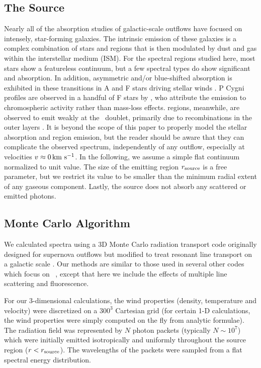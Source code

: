 \documentclass[12pt,preprint]{aastex}
\begin{document}
\subsection{The Source}

Nearly all of the absorption studies of galactic-scale outflows 
have focused on intensely, star-forming galaxies.  The
intrinsic emission of these galaxies is a complex combination of
stars and  regions that is then modulated by dust and gas
within the interstellar medium (ISM).  For the spectral regions studied
here, most stars show a featureless continuum, but a few spectral
types do show significant  and  absorption.
In addition, asymmetric and/or blue-shifted absorption is exhibited in these
transitions in A and F stars driving stellar winds \citep{sll+94}.
 P Cygni profiles are observed in a handful of F stars by \cite{sll+94}, who
attribute the emission to chromospheric activity rather than mass-loss effects.
 regions, meanwhile, are observed to emit weakly
at the \mgiid\ doublet, primarily due to recombinations in the outer
layers \citep{kbc+93}.
It is beyond the scope of this paper to
properly model the 
stellar absorption and  region emission, but the reader
should be aware that they can complicate the observed spectrum,
independently of any outflow, especially at velocities $v \approx 0 \, {\rm km~s^{-1}}$.
In the following, we assume a simple flat continuum 
normalized to unit value.  The size of the emitting
region $r_{\rm source}$ is a free parameter, but we restrict its value
to be smaller than the minimum radial extent of any gaseous
component.   Lastly, the source does not absorb any scattered or
emitted photons.


\subsection{Monte Carlo Algorithm}
\label{sec:monte}


We calculated spectra using a 3D Monte Carlo radiation transport code
originally designed for supernova outflows  \citep{Kasen_2006} but
modified to treat resonant line transport  on a galactic scale
\citep{Kasen_lyman}.  Our methods are similar to those used in several
other codes which focus on \lya\
\citep[e.g.,][]{Zheng_2002,Dijkstra_2006,Verhame_2006,Laursen_2009},
except that here we include the effects of multiple line scattering
and fluorescence. 

For our 3-dimensional calculations, the  wind properties (density, temperature and velocity) were discretized on a $300^3$ Cartesian grid (for certain 1-D calculations, the wind properties were simply computed on the fly from analytic formulae).   
The radiation field was represented by $N$ photon packets (typically $N \sim 10^7$) which were initially emitted isotropically and uniformly throughout the source region ($r < r_{\rm source}$).  The wavelengths of the packets were sampled from a flat spectral energy distribution. 
\end{document}

